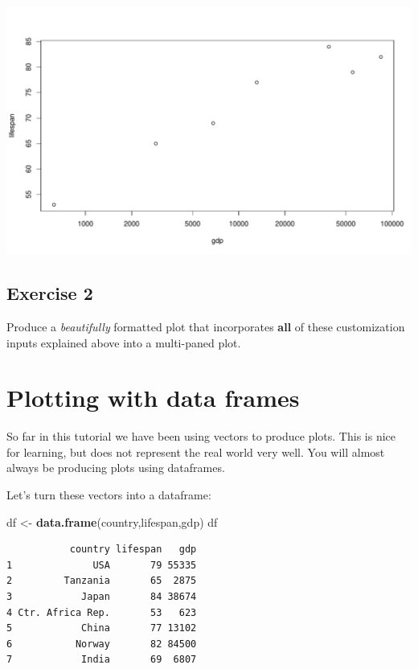 \documentclass[
]{book}
\newenvironment{Shaded}{\begin{snugshade}}{\end{snugshade}}
\newcommand{\KeywordTok}[1]{\textcolor[rgb]{0.13,0.29,0.53}{\textbf{#1}}}
\newcommand{\NormalTok}[1]{#1}
\newcommand{\StringTok}[1]{\textcolor[rgb]{0.31,0.60,0.02}{#1}}
\begin{document}
\includegraphics{figures/unnamed-chunk-116-1.pdf}

\hypertarget{exercise-2-2}{%
\subsection*{Exercise 2}\label{exercise-2-2}}

Produce a \emph{beautifully} formatted plot that incorporates \textbf{all} of these customization inputs explained above into a multi-paned plot.

\hypertarget{plotting-with-data-frames}{%
\section*{Plotting with data frames}\label{plotting-with-data-frames}}

So far in this tutorial we have been using vectors to produce plots. This is nice for learning, but does not represent the real world very well. You will almost always be producing plots using dataframes.

Let's turn these vectors into a dataframe:

\begin{Shaded}
\begin{Highlighting}[]
\NormalTok{df <-}\StringTok{ }\KeywordTok{data.frame}\NormalTok{(country,lifespan,gdp)}
\NormalTok{df}
\end{Highlighting}
\end{Shaded}

\begin{verbatim}
           country lifespan   gdp
1              USA       79 55335
2         Tanzania       65  2875
3            Japan       84 38674
4 Ctr. Africa Rep.       53   623
5            China       77 13102
6           Norway       82 84500
7            India       69  6807
\end{verbatim}
\end{document}

